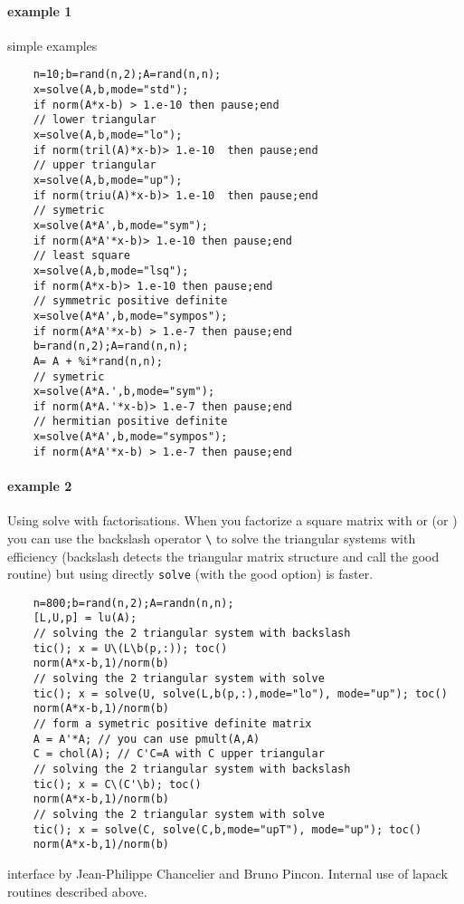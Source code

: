 \begin{examples}
  \paragraph{example 1} simple examples
  \begin{Verbatim}
    n=10;b=rand(n,2);A=rand(n,n);
    x=solve(A,b,mode="std"); 
    if norm(A*x-b) > 1.e-10 then pause;end 
    // lower triangular
    x=solve(A,b,mode="lo"); 
    if norm(tril(A)*x-b)> 1.e-10  then pause;end 
    // upper triangular 
    x=solve(A,b,mode="up"); 
    if norm(triu(A)*x-b)> 1.e-10  then pause;end 
    // symetric 
    x=solve(A*A',b,mode="sym"); 
    if norm(A*A'*x-b)> 1.e-10 then pause;end 
    // least square 
    x=solve(A,b,mode="lsq"); 
    if norm(A*x-b)> 1.e-10 then pause;end 
    // symmetric positive definite 
    x=solve(A*A',b,mode="sympos"); 
    if norm(A*A'*x-b) > 1.e-7 then pause;end 
    b=rand(n,2);A=rand(n,n);
    A= A + %i*rand(n,n);
    // symetric 
    x=solve(A*A.',b,mode="sym"); 
    if norm(A*A.'*x-b)> 1.e-7 then pause;end 
    // hermitian positive definite 
    x=solve(A*A',b,mode="sympos"); 
    if norm(A*A'*x-b) > 1.e-7 then pause;end
  \end{Verbatim}

  \paragraph{example 2} Using solve with factorisations. When you factorize a square 
  matrix with  or  (or ) you can
  use the backslash operator \verb+\+ to solve the triangular systems with efficiency
  (backslash detects the triangular matrix structure and call the good routine) but 
  using directly \verb+solve+ (with the good option) is faster.
  \begin{Verbatim}
    n=800;b=rand(n,2);A=randn(n,n);
    [L,U,p] = lu(A); 
    // solving the 2 triangular system with backslash
    tic(); x = U\(L\b(p,:)); toc()
    norm(A*x-b,1)/norm(b) 
    // solving the 2 triangular system with solve
    tic(); x = solve(U, solve(L,b(p,:),mode="lo"), mode="up"); toc()
    norm(A*x-b,1)/norm(b) 
    // form a symetric positive definite matrix
    A = A'*A; // you can use pmult(A,A)
    C = chol(A); // C'C=A with C upper triangular  
    // solving the 2 triangular system with backslash
    tic(); x = C\(C'\b); toc()
    norm(A*x-b,1)/norm(b) 
    // solving the 2 triangular system with solve
    tic(); x = solve(C, solve(C,b,mode="upT"), mode="up"); toc()
    norm(A*x-b,1)/norm(b)
  \end{Verbatim}

\end{examples}

\begin{authors}
  interface by Jean-Philippe Chancelier and Bruno Pincon. Internal use of lapack 
  routines described above.
\end{authors}
